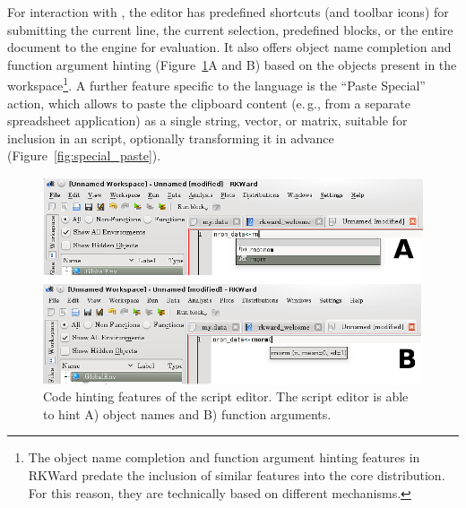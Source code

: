 For interaction with , the editor has
predefined shortcuts (and toolbar icons) for submitting the current line, the current 
selection, predefined blocks, or the entire document to the
 engine for evaluation. It also 
offers object name completion and function argument hinting 
(Figure~\ref{fig:code_hinting}A and B) based on the objects present in
the  workspace\footnote{The object name
completion and function argument hinting features in RKWard predate the
inclusion of similar features into the core
 distribution. For this reason, they are
technically based on different mechanisms.}. A further feature specific
to the  language is the
``Paste Special'' action, which allows to
paste the clipboard content (e.\,g., from a separate spreadsheet
application) as a single string, vector, or matrix, suitable
for inclusion in an  script, optionally
transforming it in advance (Figure~\ref{fig:special_paste}).

\begin{figure}[htp]
 \centering
 \includegraphics[width=15.5cm]{../figures/code_hinting.png}
 \caption{Code hinting features of the script editor. The script editor is able to hint A)  object names
and B) function arguments.}
 \label{fig:code_hinting}
\end{figure}

